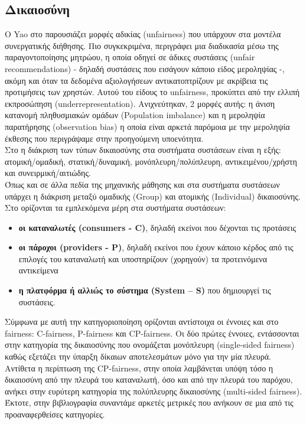 \subsection{Δικαιοσύνη}
\noindent O Yao στο \cite{NIPS2017_e6384711}  παρουσιάζει μορφές αδικίας (unfairness) που υπάρχουν στα μοντέλα συνεργατικής διήθησης. Πιο συγκεκριμένα, περιγράφει μια διαδικασία μέσω της παραγοντοποίησης μητρώου, η οποία οδηγεί σε άδικες συστάσεις (unfair recommendations) - δηλαδή συστάσεις που εισάγουν κάποιο είδος μεροληψίας -, ακόμη και όταν τα δεδομένα αξιολογήσεων αντικατοπτρίζουν με ακρίβεια τις προτιμήσεις των χρηστών. Αυτού του είδους το unfairness, προκύπτει από την ελλιπή εκπροσώπηση (underrepresentation). Ανιχνεύτηκαν, 2 μορφές αυτής: η άνιση κατανομή πληθυσμιακών ομάδων (Population imbalance) και η μεροληψία παρατήρησης (observation bias) η οποία είναι αρκετά παρόμοια με την μεροληψία έκθεσης που περιγράψαμε στην προηγούμενη υποενότητα.\\
Στο \cite{liCIKM2021Tutorial2021} η διάκριση των τύπων δικαιοσύνης στα συστήματα συστάσεων είναι η εξής: ατομική/ομαδική, στατική/δυναμική, μονόπλευρη/πολύπλευρη, αντικειμένου/χρήστη και συνειρμική/αιτιώδης.\\
Όπως και σε άλλα πεδία της μηχανικής μάθησης και στα συστήματα συστάσεων υπάρχει η διάκριση μεταξύ ομαδικής (Group) και ατομικής (Individual) δικαιοσύνης.\\
Στο \cite{burkeMultisidedFairnessRecommendation2017} ορίζονται τα εμπλεκόμενα μέρη στα συστήματα συστάσεων: \begin{itemize}
	\item \textbf{οι καταναλωτές (consumers - C)}, δηλαδή εκείνοι που δέχονται τις προτάσεις
	\item \textbf{οι πάροχοι (providers - P)}, δηλαδή εκείνοι που έχουν κάποιο κέρδος από τις επιλογές του καταναλωτή και υποστηρίζουν (χορηγούν) τα προτεινόμενα αντικείμενα 
	\item \textbf{η πλατφόρμα ή αλλιώς το σύστημα (System – S)} που δημιουργεί τις συστάσεις.
\end{itemize} Σύμφωνα με αυτή την κατηγοριοποίηση ορίζονται αντίστοιχα οι έννοιες και στο fairness: C-fairness, P-fairness και CP-fairness. Οι δύο πρώτες έννοιες, εντάσσονται στην κατηγορία της δικαιοσύνης που ονομάζεται μονόπλευρη (single-sided fairness) καθώς εξετάζει την ύπαρξη δίκαιων αποτελεσμάτων μόνο για την μία πλευρά. Αντίθετα η περίπτωση της CP-fairness, στην οποία λαμβάνεται υπόψη τόσο η δικαιοσύνη από την πλευρά του καταναλωτή, όσο και από την πλευρά του παρόχου, ανήκει στην ευρύτερη κατηγορία της πολύπλευρης δικαιοσύνης (multi-sided fairness). Έκτοτε, στην βιβλιογραφία συναντάμε αρκετές μετρικές που ανήκουν σε μια από τις προαναφερθείσες κατηγορίες. \\
